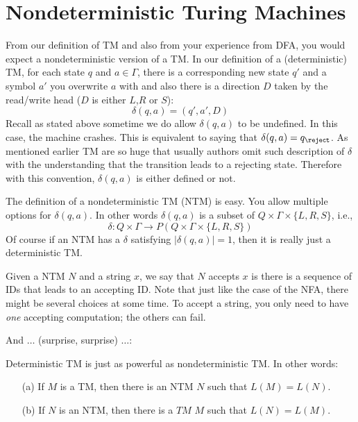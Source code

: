 \section{Nondeterministic Turing Machines}

From our definition of TM and also from your experience from DFA,
you would expect a nondeterministic version of a TM. In our
definition of a (deterministic) TM, for each state $q$ and $a \in
\Gamma$, there is a corresponding new state $q'$ and a symbol $a'$
you overwrite $a$ with and also there is a direction $D$ taken by
the read/write head ($D$ is either $L$,$R$ or $S$):
\[
 \delta(q,a) = (q',a',D)
\]
Recall as stated above sometime we do allow $\delta(q,a)$ to be
undefined. In this case, the machine crashes. This is equivalent
to saying that $\delta(q,a) = q_{\reject}$. As mentioned earlier TM
are so huge that usually authors omit such description of $\delta$
with the understanding that the transition leads to a rejecting
state. Therefore with this convention, $\delta(q,a)$ is either
defined or not.

The definition of a nondeterministic TM (NTM) is easy. You allow
multiple options for $\delta(q,a)$. In other words $\delta(q,a)$
is a subset of $Q \times \Gamma \times \{L,R,S\}$, i.e.,
\[
\delta: Q \times \Gamma
\rightarrow
P(Q \times \Gamma \times \{L, R, S\})
\]
Of course if an
NTM has a $\delta$ satisfying $|\delta(q,a)| = 1$, then it is
really just a deterministic TM.

Given a NTM $N$ and a string $x$, we say that $N$ accepts $x$ is
there is a sequence of IDs that leads to an accepting ID. Note
that just like the case of the NFA, there might be several choices
at some time. To accept a string, you only need to have
\textit{one}
accepting computation; the others can fail.

And $\ldots$ (surprise, surprise) $\ldots$:

\begin{thm} Deterministic TM is just as powerful as
nondeterministic TM. In other words:
\begin{itemize}
\item[(a)] If $M$ is a TM, then there is an NTM $N$ such that
$L(M) =
 L(N)$.
\item[(b)] If $N$ is an NTM, then there is a $TM$ $M$ such that
$L(N) = L(M)$.
\end{itemize}
\end{thm}

